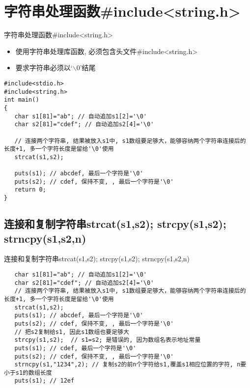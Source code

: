 
\section{字符串处理函数\#include<string.h>}

\begin{frame}{字符串处理函数\#include<string.h>}
\vspace{-0.2cm}
\begin{itemize}
	\item 使用字符串处理库函数, 必须包含头文件\#include<string.h>
	\item 要求字符串必须以`$\backslash$0'结尾
\end{itemize}
\vspace{-0.2cm}
\begin{lstlisting}
#include<stdio.h>
#include<string.h>
int main()
{
   char s1[81]="ab"; // 自动追加s1[2]='\0'
   char s2[81]="cdef"; // 自动追加s2[4]='\0'
   
   // 连接两个字符串, 结果被放入s1中, s1数组要足够大，能够容纳两个字符串连接后的长度+1, 多一个字符长度是留给'\0'使用
   strcat(s1,s2); 
   
   puts(s1); // abcdef, 最后一个字符是'\0'
   puts(s2); // cdef, 保持不变, , 最后一个字符是'\0'
   return 0;
}
\end{lstlisting}
\end{frame}

\subsection{连接和复制字符串strcat(s1,s2); strcpy(s1,s2); strncpy(s1,s2,n)}

\begin{frame}{\small{连接和复制字符串strcat(s1,s2); strcpy(s1,s2); strncpy(s1,s2,n)}}
\vspace{-0.3cm}
\begin{lstlisting}
   char s1[81]="ab"; // 自动追加s1[2]='\0'
   char s2[81]="cdef"; // 自动追加s2[4]='\0'
   // 连接两个字符串, 结果被放入s1中, s1数组要足够大，能够容纳两个字符串连接后的长度+1, 多一个字符长度是留给'\0'使用
   strcat(s1,s2); 
   puts(s1); // abcdef, 最后一个字符是'\0'
   puts(s2); // cdef, 保持不变, , 最后一个字符是'\0'
   // 把s2复制给s1, 因此s1数组也要足够大
   strcpy(s1,s2);  // s1=s2; 是错误的, 因为数组名表示地址常量
   puts(s1); // cdef, 最后一个字符是'\0'
   puts(s2); // cdef, 保持不变, , 最后一个字符是'\0'
   strncpy(s1,"1234",2); // 复制s2的前n个字符给s1,覆盖s1相应位置的字符, n要小于s1的数组长度
   puts(s1); // 12ef
\end{lstlisting}
\end{frame}

